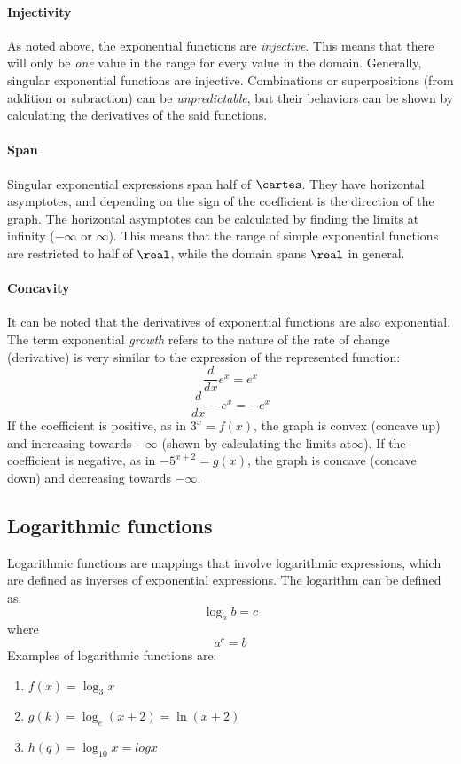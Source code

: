 \paragraph{Injectivity} As noted above, the exponential functions are \emph{injective}.
This means that there will only be \emph{one} value in the range for every value in the domain.
Generally, singular exponential functions are injective.
Combinations or superpositions (from addition or subraction) can be \emph{unpredictable}, but their behaviors can be shown by calculating the derivatives of the said functions.

\paragraph{Span} Singular exponential expressions span half of $\cartes$.
They have horizontal asymptotes, and depending on the sign of the coefficient is the direction of the graph.
The horizontal asymptotes can be calculated by finding the limits at infinity ($-\infty$ or $\infty$).
This means that the range of simple exponential functions are restricted to half of $\real$, while the domain spans $\real$ in general.

\paragraph{Concavity} It can be noted that the derivatives of exponential functions are also exponential.
The term exponential \emph{growth} refers to the nature of the rate of change (derivative) is very similar to the expression of the represented function:
$$\frac{d}{dx} e^x = e^x$$
$$\frac{d}{dx} -e^{x} = -e^x$$
If the coefficient is positive, as in $3^x = f(x)$, the graph is convex (concave up) and increasing towards $-\infty$ (shown by calculating the limits at$\infty$).
If the coefficient is negative, as in $-5^{x+2} = g(x)$, the graph is concave (concave down) and decreasing towards $-\infty$.

\subsection{Logarithmic functions}

Logarithmic functions are mappings that involve logarithmic expressions, which are defined as inverses of exponential expressions.
The logarithm can be defined as:
$$\log_a b = c$$
where
$$a^c = b$$
Examples of logarithmic functions are:
\begin{enumerate}
  \item $f(x) = \log_3 x$
  \item $g(k) = \log_e (x+2) = \ln (x+2)$
  \item $h(q) = \log_10 x = log x$
\end{enumerate}

